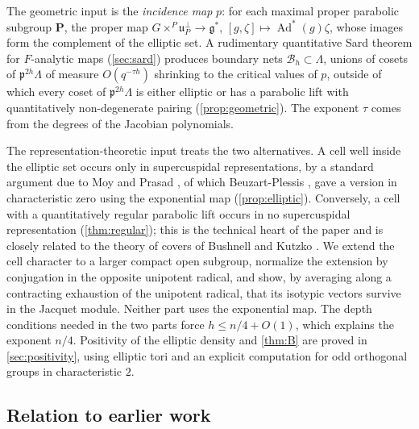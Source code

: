 \documentclass[11pt,reqno]{amsart}
\numberwithin{equation}{section}
\theoremstyle{plain}
\theoremstyle{definition}
\theoremstyle{remark}
\theoremstyle{plain}
\newcommand{\pp}{\mathfrak{p}}   %
\newcommand{\Lat}{\mathcal{L}}   %
\newcommand{\dLat}{\Lambda}      %
\newcommand{\bG}{\mathbf{G}}     %
\newcommand{\bP}{\mathbf{P}}     %
\newcommand{\g}{\mathfrak{g}}    %
\newcommand{\gd}{\mathfrak{g}^*} %
\newcommand{\uu}{\mathfrak{u}}   %
\newcommand{\Bad}{\mathcal{B}}   %
\newcommand{\bnets}{boundary nets}
\DeclareMathOperator{\Ad}{Ad}
\newcommand{\eexp}{\tau}
\newcommand{\nf}{\zeta}
\begin{document}
The geometric input is the \emph{incidence map} $p$: for each maximal
proper parabolic subgroup $\bP$, the proper map
$G\times^P\uu_P^\perp\to\gd$, $[g,\nf]\mapsto\Ad^*(g)\nf$, whose images form
the complement of the elliptic set. A rudimentary quantitative Sard theorem
for $F$-analytic maps (\cref{sec:sard}) produces \bnets{} $\Bad_h\subset\dLat$,
unions of cosets of $\pp^{2h}\dLat$ of measure $O(q^{-\eexp h})$ shrinking to
the critical values of $p$, outside of which every coset of
$\pp^{2h}\dLat$ is either elliptic or has a parabolic lift with
quantitatively non-degenerate pairing (\cref{prop:geometric}). The exponent
$\eexp$ comes from the degrees of the Jacobian polynomials.

The representation-theoretic input treats the two alternatives. A cell well
inside the elliptic set occurs only in supercuspidal representations, by a
standard argument due to Moy and Prasad \cite[Corollary~4.9]{MR1371680},
of which Beuzart-Plessis \cite{MR3463423}, \cite[Appendix~D]{MR4325284} gave a version in
characteristic zero using the exponential map
(\cref{prop:elliptic}). Conversely, a cell with a quantitatively regular
parabolic lift occurs in no supercuspidal representation
(\cref{thm:regular}); this is the technical heart of the paper and is
closely related to the theory of covers of Bushnell and Kutzko
\cite{MR1643417}. We extend the cell character to a larger compact open
subgroup, normalize the extension by conjugation in the opposite unipotent
radical, and show, by averaging along a contracting exhaustion of the
unipotent radical, that its isotypic vectors survive in the Jacquet module.
Neither part uses the exponential map. The depth conditions needed in the
two parts force $h\le n/4+O(1)$, which explains the exponent $n/4$.
Positivity of the elliptic density and \cref{thm:B} are proved in
\cref{sec:positivity}, using elliptic tori and an explicit computation for
odd orthogonal groups in characteristic $2$.

\subsection{Relation to earlier work}\label{sec:related}
\end{document}
